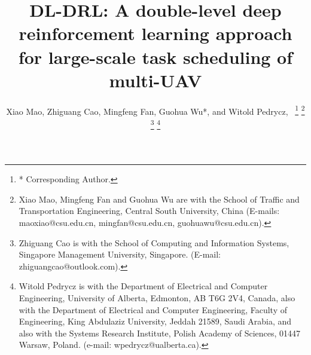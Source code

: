 \documentclass[lettersize,journal]{IEEEtran}
\begin{document}
	
	\title{DL-DRL: A double-level deep reinforcement learning approach for large-scale task scheduling of multi-UAV}
	
	\author{Xiao Mao, Zhiguang Cao, Mingfeng Fan, Guohua Wu*, and Witold Pedrycz,~
		\thanks{* Corresponding Author.}
		\thanks{Xiao Mao, Mingfeng Fan and Guohua Wu are with the School of Traffic and Transportation Engineering, Central South University, China (E-mails: maoxiao@csu.edu.cn, mingfan@csu.edu.cn, guohuawu@csu.edu.cn).}
		\thanks{Zhiguang Cao is with the School of Computing and Information Systems, Singapore Management University, Singapore. (E-mail: zhiguangcao@outlook.com).}
		\thanks{Witold Pedrycz is with the Department of Electrical and Computer Engineering, University of Alberta, Edmonton, AB T6G 2V4, Canada, also with the Department of Electrical and Computer Engineering, Faculty of Engineering, King Abdulaziz University, Jeddah 21589, Saudi Arabia, and also with the Systems Research Institute, Polish Academy of Sciences, 01447 Warsaw, Poland. (e-mail: wpedrycz@ualberta.ca).}
	}
	\markboth{}
	{}
	
	\maketitle
	
\end{document}
